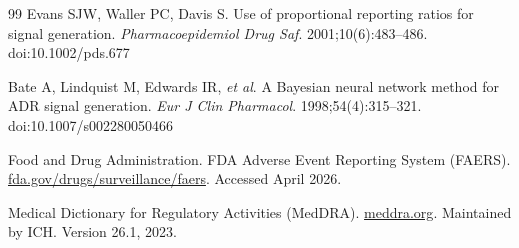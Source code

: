\documentclass[10pt,twocolumn]{article}
\begin{document}
\begin{thebibliography}{99}
Evans SJW, Waller PC, Davis S.
Use of proportional reporting ratios for signal generation.
\textit{Pharmacoepidemiol Drug Saf}. 2001;10(6):483--486.
doi:10.1002/pds.677
 
Bate A, Lindquist M, Edwards IR, \textit{et al}.
A Bayesian neural network method for ADR signal generation.
\textit{Eur J Clin Pharmacol}. 1998;54(4):315--321.
doi:10.1007/s002280050466
 
Food and Drug Administration.
FDA Adverse Event Reporting System (FAERS).
\href{https://www.fda.gov/drugs/surveillance/fda-adverse-event-reporting-system-faers}{fda.gov/drugs/surveillance/faers}.
Accessed April 2026.
 
Medical Dictionary for Regulatory Activities (MedDRA).
\href{https://www.meddra.org}{meddra.org}.
Maintained by ICH. Version 26.1, 2023.
 
\end{thebibliography}
 
\end{document}
